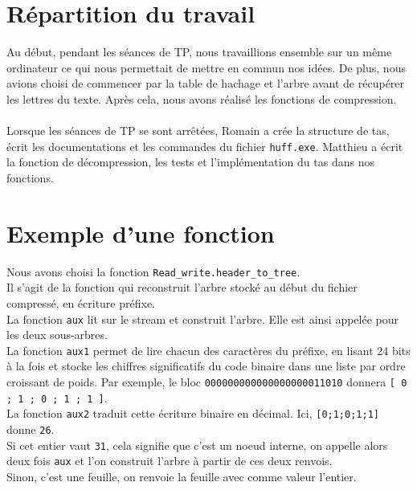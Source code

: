 \documentclass{article}
\begin{document}
  \section*{Répartition du travail}
  Au début, pendant les séances de TP, nous travaillions ensemble sur un même ordinateur ce qui nous permettait de mettre en commun nos idées. De plus, nous avions choisi de commencer par la table de hachage et l'arbre avant de récupérer les lettres du texte. Après cela, nous avons réalisé les fonctions de compression. \\ \\
  Lorsque les séances de TP se sont arrêtées, Romain a crée la structure de tas, écrit les documentations et les commandes du fichier \texttt{huff.exe}. Matthieu a écrit la fonction de décompression, les tests et l'implémentation du tas dans nos fonctions.

  \section*{Exemple d'une fonction}
  Nous avons choisi la fonction \texttt{Read\_write.header\_to\_tree}. \\
  Il s'agit de la fonction qui reconstruit l'arbre stocké au début du fichier compressé, en écriture préfixe. \\
  La fonction \texttt{aux} lit sur le stream et construit l'arbre. Elle est ainsi appelée pour les deux sous-arbres. \\
  La fonction \texttt{aux1} permet de lire chacun des caractères du préfixe, en lisant 24 bits à la fois et stocke les chiffres significatifs du code binaire dans une liste par ordre croissant de poids. Par exemple, le bloc \texttt{000000000000000000011010} donnera \texttt{[ 0 ; 1 ; 0 ; 1 ; 1 ]}. \\
  La fonction \texttt{aux2} traduit cette écriture binaire en décimal. Ici, \texttt{[0;1;0;1;1]} donne \texttt{26}. \\
  Si cet entier vaut \texttt{31}, cela signifie que c'est un noeud interne, on appelle alors deux fois \texttt{aux} et l'on construit l'arbre à partir de ces deux renvois. \\
  Sinon, c'est une feuille, on renvoie la feuille avec comme valeur l'entier.
\end{document}
